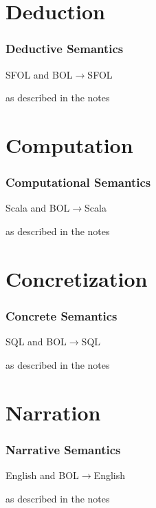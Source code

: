 \section{Deduction}

\begin{frame}\frametitle{Deductive Semantics}
SFOL and BOL$\to$SFOL

as described in the notes
\end{frame}

\section{Computation}

\begin{frame}\frametitle{Computational Semantics}
Scala and BOL$\to$Scala

as described in the notes
\end{frame}

\section{Concretization}

\begin{frame}\frametitle{Concrete Semantics}
SQL and BOL$\to$SQL

as described in the notes
\end{frame}

\section{Narration}

\begin{frame}\frametitle{Narrative Semantics}
English and BOL$\to$English

as described in the notes
\end{frame}
